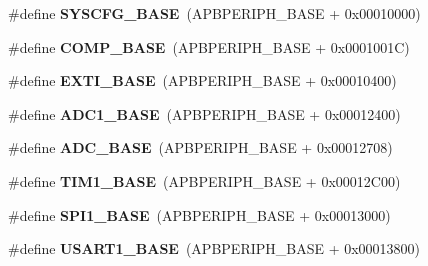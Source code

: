 \begin{DoxyCompactItemize}
\item 
\mbox{\label{group___peripheral__memory__map_ga62246020bf3b34b6a4d8d0e84ec79d3d}} 
\#define {\bfseries S\+Y\+S\+C\+F\+G\+\_\+\+B\+A\+SE}~(A\+P\+B\+P\+E\+R\+I\+P\+H\+\_\+\+B\+A\+SE + 0x00010000)
\item 
\mbox{\label{group___peripheral__memory__map_gaa9f5d2999c6918e385d7a526c4f6b1d3}} 
\#define {\bfseries C\+O\+M\+P\+\_\+\+B\+A\+SE}~(A\+P\+B\+P\+E\+R\+I\+P\+H\+\_\+\+B\+A\+SE + 0x0001001\+C)
\item 
\mbox{\label{group___peripheral__memory__map_ga87371508b3bcdcd98cd1ec629be29061}} 
\#define {\bfseries E\+X\+T\+I\+\_\+\+B\+A\+SE}~(A\+P\+B\+P\+E\+R\+I\+P\+H\+\_\+\+B\+A\+SE + 0x00010400)
\item 
\mbox{\label{group___peripheral__memory__map_ga695c9a2f892363a1c942405c8d351b91}} 
\#define {\bfseries A\+D\+C1\+\_\+\+B\+A\+SE}~(A\+P\+B\+P\+E\+R\+I\+P\+H\+\_\+\+B\+A\+SE + 0x00012400)
\item 
\mbox{\label{group___peripheral__memory__map_gad06cb9e5985bd216a376f26f22303cd6}} 
\#define {\bfseries A\+D\+C\+\_\+\+B\+A\+SE}~(A\+P\+B\+P\+E\+R\+I\+P\+H\+\_\+\+B\+A\+SE + 0x00012708)
\item 
\mbox{\label{group___peripheral__memory__map_gaf8aa324ca5011b8173ab16585ed7324a}} 
\#define {\bfseries T\+I\+M1\+\_\+\+B\+A\+SE}~(A\+P\+B\+P\+E\+R\+I\+P\+H\+\_\+\+B\+A\+SE + 0x00012\+C00)
\item 
\mbox{\label{group___peripheral__memory__map_ga50cd8b47929f18b05efbd0f41253bf8d}} 
\#define {\bfseries S\+P\+I1\+\_\+\+B\+A\+SE}~(A\+P\+B\+P\+E\+R\+I\+P\+H\+\_\+\+B\+A\+SE + 0x00013000)
\item 
\mbox{\label{group___peripheral__memory__map_ga86162ab3f740db9026c1320d46938b4d}} 
\#define {\bfseries U\+S\+A\+R\+T1\+\_\+\+B\+A\+SE}~(A\+P\+B\+P\+E\+R\+I\+P\+H\+\_\+\+B\+A\+SE + 0x00013800)
\item 
\mbox{\label{group___peripheral__memory__map_ga7ab42ce1846930569d742d339b554078}} 

\end{DoxyCompactItemize}
